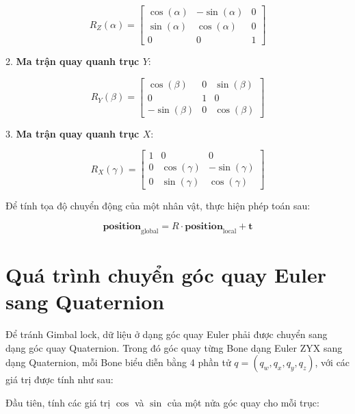 \[
R_Z(\alpha) = 
\begin{bmatrix}
	\cos(\alpha) & -\sin(\alpha) & 0 \\
	\sin(\alpha) & \cos(\alpha) & 0 \\
	0 & 0 & 1
\end{bmatrix}
\]

2. \textbf{Ma trận quay quanh trục \(Y\)}:

\[
R_Y(\beta) = 
\begin{bmatrix}
	\cos(\beta) & 0 & \sin(\beta) \\
	0 & 1 & 0 \\
	-\sin(\beta) & 0 & \cos(\beta)
\end{bmatrix}
\]

3. \textbf{Ma trận quay quanh trục \(X\)}:

\[
R_X(\gamma) = 
\begin{bmatrix}
	1 & 0 & 0 \\
	0 & \cos(\gamma) & -\sin(\gamma) \\
	0 & \sin(\gamma) & \cos(\gamma)
\end{bmatrix}
\]

Để tính tọa độ chuyển động của một nhân vật, thực hiện phép toán sau:

\begin{equation}
	\mathbf{position}_{\text{global}} = R \cdot \mathbf{position}_{\text{local}} + \mathbf{t}
\end{equation}


\section{Quá trình chuyển góc quay Euler sang Quaternion}
\label{appendix:BVHData:QuaternionConvert}



Để tránh Gimbal lock, dữ liệu ở dạng góc quay Euler phải được chuyển sang dạng góc quay Quaternion. Trong đó góc quay từng Bone dạng Euler ZYX sang dạng Quaternion, mỗi Bone biểu diễn bằng 4 phần tử $q = (q_w, q_x, q_y, q_z)$, với các giá trị được tính như sau:

Đầu tiên, tính các giá trị $\cos$ và $\sin$ của một nửa góc quay cho mỗi trục:



